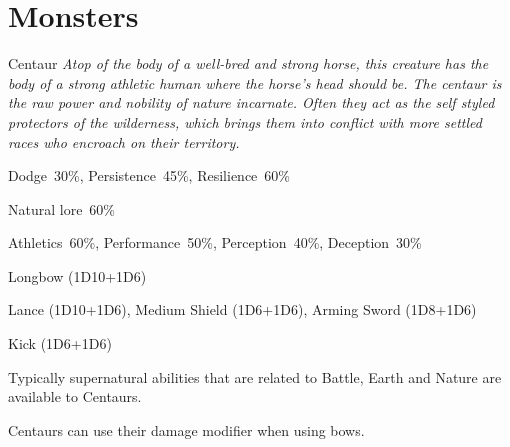 \clearpage

\section{Monsters}

\begin{monsterbox}{Centaur}
	\textit{Atop of the body of a well-bred and strong horse, this creature has the body of a strong athletic human where the horse’s head should be. The centaur is the raw power and nobility of nature incarnate. Often they act as the self styled protectors of the wilderness, which brings them into conflict with more settled races who encroach on their territory.}\\
	\rpghline
	\basics[%
        hitpoints  = 19, %
	majorwound = 10,
	damagemodifier = +1D6,
	powerpoints = 11,
	movementrate = 23m,
	armor = Leather (2AP),
	plunderrating = 2
	]
	\rpghline%
	\stats[ %
		STR = 3D6+6 (17),
		CON = 3D6   (11),
		DEX = 3D6+3 (14),
		SIZ = 4D6+12 (26),
		INT = 2D6+6 (13),
		POW = 3D6   (11),
		CHA = 3D6   (11)
	]
	\rpghline%
	\begin{rpg-monsteraction}[Resistances]
		Dodge~30\%, Persistence~45\%, Resilience~60\%
	\end{rpg-monsteraction}
	\begin{rpg-monsteraction}[Knowledge]
    		Natural lore~60\%
	\end{rpg-monsteraction}
	\begin{rpg-monsteraction}[Practical]
		Athletics~60\%, Performance~50\%, Perception~40\%, Deception~30\%
	\end{rpg-monsteraction}
	\begin{rpg-monsteraction}
		Longbow (1D10+1D6)
	\end{rpg-monsteraction}
	\begin{rpg-monsteraction}
		Lance (1D10+1D6), Medium Shield (1D6+1D6), Arming Sword (1D8+1D6)
	\end{rpg-monsteraction}
	\begin{rpg-monsteraction}
		Kick (1D6+1D6)
	\end{rpg-monsteraction}
	\begin{rpg-monsteraction}[Supernatural]
		Typically supernatural abilities that are related to Battle, Earth and Nature are available to Centaurs.
	\end{rpg-monsteraction}
	\begin{rpg-monsteraction}
		Centaurs can use their damage modifier when using bows.
	\end{rpg-monsteraction}

\end{monsterbox}

